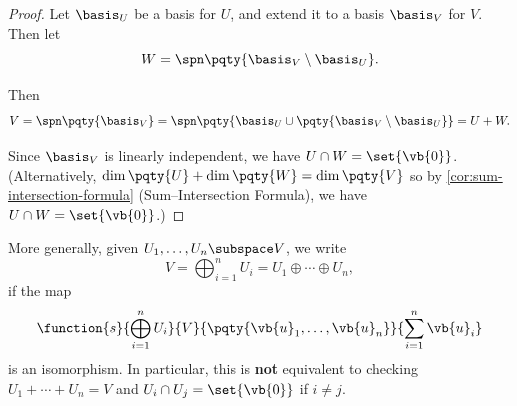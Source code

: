 \begin{proof}
    Let \(\basis_U\) be a basis for \(U\), and extend it to a basis \(\basis_V\) for \(V\). Then let
    \[
        W = \spn \pqty{\basis_V \setminus \basis_U}.
    \]

    Then
    \[
        V = \spn \pqty{\basis_V} = \spn \pqty{\basis_U \cup \pqty{\basis_V \setminus \basis_U}} = U + W.
    \]

    Since \(\basis_V\) is linearly independent, we have \(U \cap W = \set{\vb{0}}\). (Alternatively, \(\dim\pqty{U} + \dim\pqty{W} = \dim\pqty{V}\) so by \autoref{cor:sum-intersection-formula} (Sum--Intersection Formula), we have \(U \cap W = \set{\vb{0}}\).)
\end{proof}

More generally, given \(U_1, \ldots, U_n \subspace V\), we write
\[
    V = \bigoplus_{i = 1}^{n} U_i = U_1 \oplus \cdots \oplus U_n,
\]
if the map
\[
    \function{s}{\bigoplus_{i = 1}^{n} U_i}{V}{\pqty{\vb{u}_1, \ldots, \vb{u}_n}}{\sum_{i = 1}^{n} \vb{u}_i}
\]
is an isomorphism. In particular, this is \textbf{not} equivalent to checking \(U_1 + \cdots + U_n = V\) and \(U_i \cap U_j = \set{\vb{0}}\) if \(i \neq j\).